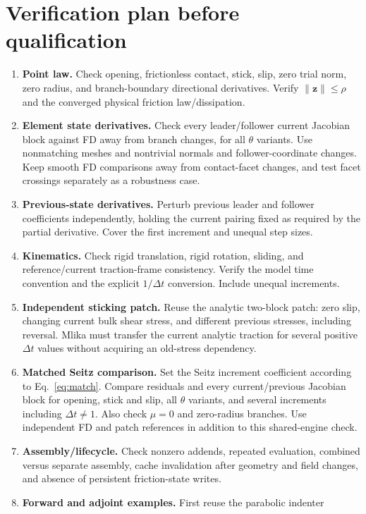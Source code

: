 \documentclass[11pt,a4paper]{article}
\begin{document}
\section{Verification plan before qualification}
\begin{enumerate}[leftmargin=*]
\item \textbf{Point law.} Check opening, frictionless contact, stick, slip,
zero trial norm, zero radius, and branch-boundary directional derivatives.
Verify $\|\bm z\|\leq\rho$ and the converged physical friction law/dissipation.
\item \textbf{Element state derivatives.} Check every leader/follower current
Jacobian block against FD away from branch changes, for all $\theta$ variants.
Use nonmatching meshes and nontrivial normals and follower-coordinate changes.
Keep smooth FD comparisons away from contact-facet changes, and test facet
crossings separately as a robustness case.
\item \textbf{Previous-state derivatives.} Perturb previous leader and follower
coefficients independently, holding the current pairing fixed as required by the
partial derivative. Cover the first increment and unequal step sizes.
\item \textbf{Kinematics.} Check rigid translation, rigid rotation, sliding,
and reference/current traction-frame consistency. Verify the model time
convention and the explicit $1/\Delta t$ conversion. Include unequal increments.
\item \textbf{Independent sticking patch.} Reuse the analytic two-block patch:
zero slip, changing current bulk shear stress, and different previous stresses,
including reversal. Mlika must transfer the current analytic traction for several
positive $\Delta t$ values without acquiring an old-stress dependency.
\item \textbf{Matched Seitz comparison.} Set the Seitz increment coefficient
according to Eq.~\eqref{eq:match}. Compare residuals and every current/previous
Jacobian block for opening, stick and slip, all $\theta$ variants, and several
increments including $\Delta t\ne1$. Also check $\mu=0$ and zero-radius branches.
Use independent FD and patch references in addition to this shared-engine check.
\item \textbf{Assembly/lifecycle.} Check nonzero addends, repeated evaluation,
combined versus separate assembly, cache invalidation after geometry and field
changes, and absence of persistent friction-state writes.
\item \textbf{Forward and adjoint examples.} First reuse the parabolic indenter

\end{enumerate}
\end{document}
